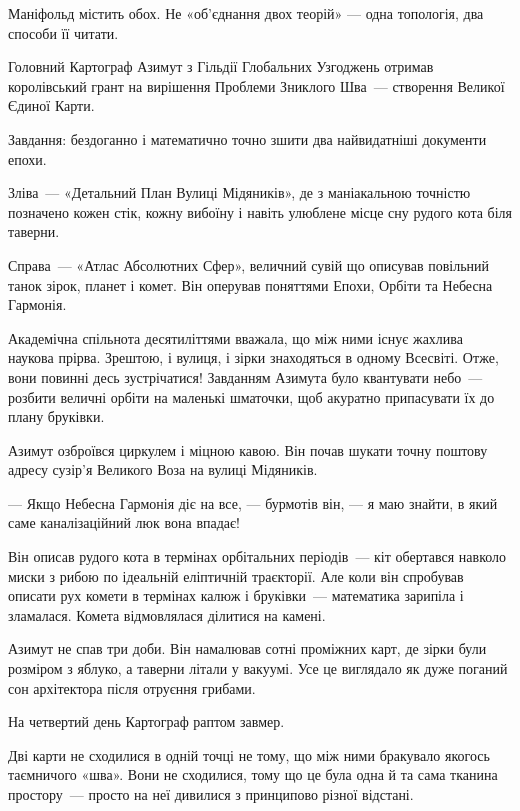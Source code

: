 \documentclass[12pt, a4paper, openany]{book}
\begin{document}
Маніфольд містить обох. Не «об'єднання двох теорій» --- одна топологія, два способи її читати.






\begin{terrybox}
Головний Картограф Азимут з Гільдії Глобальних Узгоджень отримав королівський грант на вирішення Проблеми Зниклого Шва~--- створення Великої Єдиної Карти.

Завдання: бездоганно і математично точно зшити два найвидатніші документи епохи.

Зліва~--- «Детальний План Вулиці Мідяників», де з маніакальною точністю позначено кожен стік, кожну вибоїну і навіть улюблене місце сну рудого кота біля таверни.

Справа~--- «Атлас Абсолютних Сфер», величний сувій що описував повільний танок зірок, планет і комет. Він оперував поняттями Епохи, Орбіти та Небесна Гармонія.

Академічна спільнота десятиліттями вважала, що між ними існує жахлива наукова прірва. Зрештою, і вулиця, і зірки знаходяться в одному Всесвіті. Отже, вони повинні десь зустрічатися! Завданням Азимута було квантувати небо~--- розбити величні орбіти на маленькі шматочки, щоб акуратно припасувати їх до плану бруківки.

\medskip
Азимут озброївся циркулем і міцною кавою. Він почав шукати точну поштову адресу сузір'я Великого Воза на вулиці Мідяників.

--- Якщо Небесна Гармонія діє на все, --- бурмотів він, --- я маю знайти, в який саме каналізаційний люк вона впадає!

Він описав рудого кота в термінах орбітальних періодів~--- кіт обертався навколо миски з рибою по ідеальній еліптичній траєкторії. Але коли він спробував описати рух комети в термінах калюж і бруківки~--- математика зарипіла і зламалася. Комета відмовлялася ділитися на камені.

Азимут не спав три доби. Він намалював сотні проміжних карт, де зірки були розміром з яблуко, а таверни літали у вакуумі. Усе це виглядало як дуже поганий сон архітектора після отруєння грибами.

\medskip
На четвертий день Картограф раптом завмер.

Дві карти не сходилися в одній точці не тому, що між ними бракувало якогось таємничого «шва». Вони не сходилися, тому що це була одна й та сама тканина простору~--- просто на неї дивилися з принципово різної відстані.


\end{terrybox}
\end{document}
